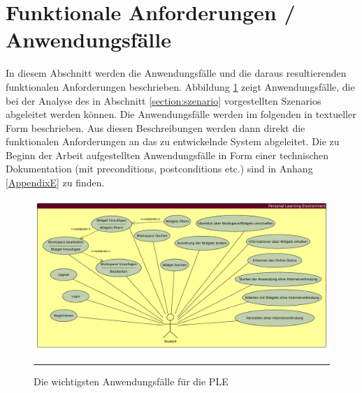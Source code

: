 \section{Funktionale Anforderungen / Anwendungsfälle}\label{section:anwendungsfaelle}
In diesem Abschnitt werden die Anwendungsfälle und die daraus resultierenden funktionalen Anforderungen beschrieben. Abbildung \ref{fig:anwendungsfaelle} zeigt Anwendungsfälle, die bei der Analyse des in Abschnitt \ref{section:szenario} vorgestellten Szenarios abgeleitet werden können. Die Anwendungsfälle werden im folgenden in textueller Form beschrieben. Aus diesen Beschreibungen werden dann direkt die funktionalen Anforderungen an das zu entwickelnde System abgeleitet. Die zu Beginn der Arbeit aufgestellten Anwendungsfälle in Form einer technischen Dokumentation (mit preconditions, postconditions etc.) sind in Anhang \ref{AppendixE} zu finden.

\begin{figure}[H]
  \centering
  \includegraphics[width=\textwidth,height=\textheight,keepaspectratio]{./Figures/anwendungsfaelle_quer.pdf}
    \rule{35em}{0.5pt}
  \caption[Anwendungsfälle der \acs{PLE}]{Die wichtigsten Anwendungsfälle für die \acs{PLE}}
  \label{fig:anwendungsfaelle}
\end{figure}

